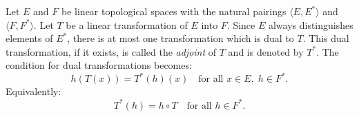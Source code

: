 \begin{definition}
\label{def:adjoint}
Let $E$ and $F$ be linear topological spaces with the natural pairings $\langle E, E^* \rangle$ and $\langle F, F^* \rangle$. Let $T$ be a linear transformation of $E$ into $F$. Since $E$ always distinguishes elements of $E^*$, there is at most one transformation which is dual to $T$. This dual transformation, if it exists, is called the \emph{adjoint} of $T$ and is denoted by $T^*$. The condition for dual transformations becomes:
$$h(T(x)) = T^*(h)(x) \quad \text{for all } x \in E,\; h \in F^*.$$
Equivalently:
$$T^*(h) = h \circ T \quad \text{for all } h \in F^*.$$
\end{definition}
